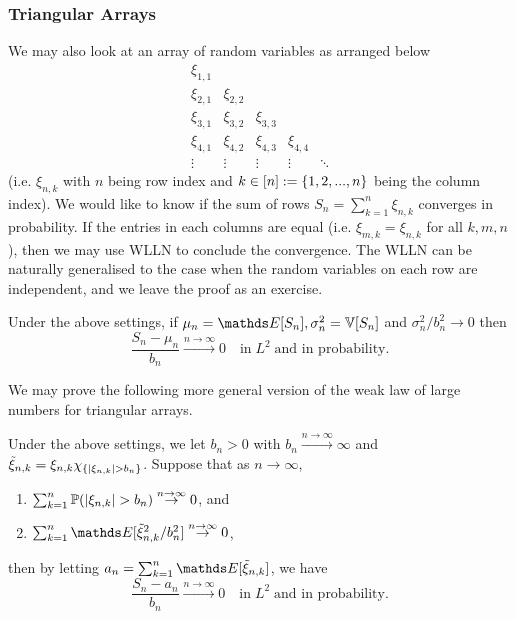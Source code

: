 \begin{unexaminable}
\subsubsection{Triangular Arrays}
We may also look at an array of random variables as arranged below
\begin{equation*}
\begin{array}{ccccc}
    \xi_{1,1} &  &  &  & \\
    \xi_{2,1} & \xi_{2,2} &  &  & \\
    \xi_{3,1} & \xi_{3,2} & \xi_{3,3} &  & \\
    \xi_{4,1} & \xi_{4,2} & \xi_{4,3} &  \xi_{4,4} & \\
    \vdots & \vdots & \vdots & \vdots & \ddots
\end{array}
\end{equation*}
(i.e. $\xi_{n,k}$ with $n$ being row index and $k \in [n] := \left\{ 1,2,...,n \right \}$ being the column index). We would like to know if the sum of rows $S_n = \sum_{k=1}^n \xi_{n,k}$ converges in probability. If the entries in each columns are equal (i.e. $\xi_{m,k} = \xi_{n,k}$ for all $k,m,n$), then we may use WLLN to conclude the convergence. The WLLN can be naturally generalised to the case when the random variables on each row are independent, and we leave the proof as an exercise.
\begin{exercise} \label{ex:L2_WLLN_Array}
Under the above settings, if $\mu_n = \E[S_n], \sigma^2_n = \V[S_n]$ and $\sigma_n^2/b_n^2 \to 0$ then 
\begin{equation*}
\frac{S_n - \mu_n}{b_n} \overset{n\to\infty}\to 0 \quad \text{in} \; L^2 \; \text{and in probability.}
\end{equation*}
\end{exercise}

We may prove the following more general version of the weak law of large numbers for triangular arrays.
\begin{theorem}
Under the above settings, we let $b_n > 0$ with $b_n \overset{n\to\infty}\to \infty$ and $\tilde{\xi}_{n,k} = \xi_{n,k} \chi_{\left\{ |\xi_{n,k}| > b_n \right \}}$. Suppose that as $n\to\infty$,
\begin{enumerate}
\item $\sum_{k=1}^n \mathbb{P}(|\xi_{n,k}| > b_n) \overset{n\to\infty}\to 0$, and
\item $\sum_{k=1}^n \E[\tilde{\xi}_{n,k}^2 / b_n^2] \overset{n\to\infty}\to 0$,
\end{enumerate}
then by letting $a_n = \sum_{k=1}^n \E[\tilde{\xi}_{n,k}]$, we have 
\begin{equation*}
\frac{S_n - a_n}{b_n} \overset{n\to\infty}\to 0 \quad \text{in} \; L^2 \; \text{and in probability.}
\end{equation*}
\end{theorem}


\end{unexaminable}

